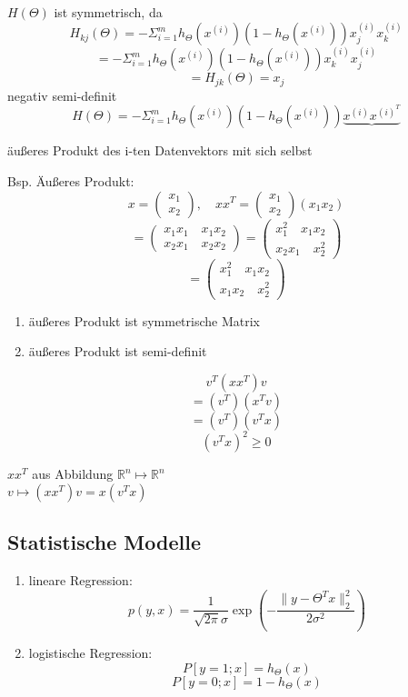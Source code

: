 \begin{enumerate}[(1)]
$H(\Theta)$ ist symmetrisch, da
\[H_{kj}(\Theta) = - \Sigma^m_{i=1} h_\Theta (x^{(i)})(1-h_\Theta (x^{(i)})) x_j^{(i)} x_k^{(i)}\]
\[= - \Sigma^m_{i=1} h_\Theta(x^{(i)})(1-h_\Theta(x^{(i)})) x_k^{(i)}x_j^{(i)}\]
\[= H_{jk}(\Theta) = x_j\]
negativ semi-definit
\[H(\Theta) = - \Sigma^m_{i=1} h_\Theta(x^{(i)})(1-h_\Theta(x^{(i)})) \underbrace{x^{(i)}x^{(i)^T}}\]
\begin{center}
äußeres Produkt des i-ten Datenvektors mit sich selbst
\end{center}
Bsp. Äußeres Produkt:
\[x = \left( \begin{array}{ccc} x_1 \\ x_2 \end{array} \right), \quad x x^T = \left( \begin{array}{ccc} x_1 \\ x_2 \end{array} \right) (x_1 x_2) \]
\[= \left( \begin{array}{ccc} x_1x_1 \quad x_1x_2 \\ x_2x_1 \quad x_2x_2 \end{array} \right) = \left( \begin{array}{ccc} x_1^2 \quad x_1x_2 \\ x_2x_1 \quad x_2^2 \end{array} \right)\]
\[ = \left( \begin{array}{ccc} x_1^2 \quad x_1x_2 \\ x_1x_2 \quad x_2^2 \end{array} \right)\]
\begin{enumerate}[(1)]
\item äußeres Produkt ist symmetrische Matrix
\item äußeres Produkt ist semi-definit
\end{enumerate}
\[v^T (x x^T)v\]
\[= (v^T)(x^T v)\]
\[= (v^T)(v^T x)\]
\[(v^T x)^2 \geq 0\]
\begin{center}
$xx^T$ aus Abbildung $\mathbb{R}^n \mapsto \mathbb{R}^n$\\
$v \mapsto (xx^T)v = x(v^Tx)$
\end{center}

\subsection*{Statistische Modelle}
\begin{enumerate}[1.]
\item lineare Regression: \[p(y,x) = \frac{1}{\sqrt{2 \pi} \sigma} \exp(- \frac{\lVert y- \Theta^T x \lVert^2_2}{2 \sigma^2})\]
\item logistische Regression: \[P[y=1;x] = h_\Theta(x)\]
\[P[y=0;x] = 1-h_\Theta(x)\]
\end{enumerate}


\end{enumerate}
